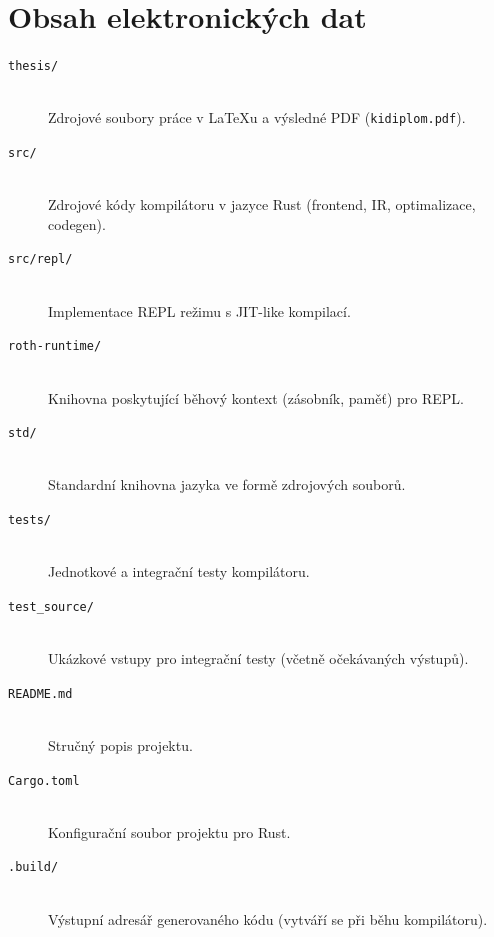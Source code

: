 \section{Obsah elektronických dat}
\label{sec:ObsahData}

\begin{description}
	\item[\texttt{thesis/}] \hfill \\
	      Zdrojové soubory práce v \LaTeX{}u a výsledné PDF (\texttt{kidiplom.pdf}).

	\item[\texttt{src/}] \hfill \\
	      Zdrojové kódy kompilátoru \Roth{} v jazyce Rust (frontend, IR, optimalizace, codegen).

	\item[\texttt{src/repl/}] \hfill \\
	      Implementace REPL režimu s JIT-like kompilací.

	\item[\texttt{roth-runtime/}] \hfill \\
	      Knihovna poskytující běhový kontext (zásobník, paměť) pro REPL.

	\item[\texttt{std/}] \hfill \\
	      Standardní knihovna jazyka ve formě \Roth{} zdrojových souborů.

	\item[\texttt{tests/}] \hfill \\
	      Jednotkové a integrační testy kompilátoru.

	\item[\texttt{test\_source/}] \hfill \\
	      Ukázkové vstupy pro integrační testy (včetně očekávaných výstupů).

	\item[\texttt{README.md}] \hfill \\
	      Stručný popis projektu.

	\item[\texttt{Cargo.toml}] \hfill \\
	      Konfigurační soubor projektu pro Rust.

	\item[\texttt{.build/}] \hfill \\
	      Výstupní adresář generovaného kódu (vytváří se při běhu kompilátoru).
\end{description}
